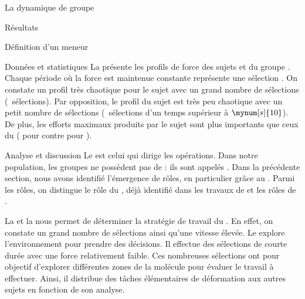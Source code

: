 \documentclass[myfrancais,ngerman,english,french]{mythesis}
\begin{document}
\begin{mychapter}{La dynamique de groupe}
\begin{mysection}{Résultats}
\begin{mysubsection}{Définition d'un meneur}
\begin{mysubsubsection}{Données et statistiques}
					La  présente les profils de force  des sujets  et  du groupe .
					Chaque période où la force est maintenue constante représente une sélection .
					On constate un profil très chaotique pour le sujet  avec un grand nombre de sélections (~sélections).
					Par opposition, le profil du sujet  est très peu chaotique avec un petit nombre de sélections (~sélections d'un temps supérieur à $\mynum[s]{10}$).
					De plus, les efforts maximaux produits par le sujet  sont plus importants que ceux du  ( pour  contre  pour ).
				\end{mysubsubsection}
				\begin{mysubsubsection}{Analyse et discussion}
					Le  est celui qui dirige les opérations.
					Dans notre population, les groupes ne possèdent \myapriori pas de  : ils sont appelés \og {} \fg {}.
					Dans la précédente section, nous avons identifié l'émergence de rôles, en particulier grâce au \mybrainstorming.
					Parmi les rôles, on distingue le rôle du , déjà identifié dans les travaux de  et les rôles de .

					La  et la  nous permet de déterminer la stratégie de travail du .
					En effet, on constate un grand nombre de sélections ainsi qu'une vitesse élevée.
					Le  explore l'environnement pour prendre des décisions.
					Il effectue des sélections de courte durée avec une force relativement faible.
					Ces nombreuses sélections ont pour objectif d'explorer différentes zones de la molécule pour évaluer le travail à effectuer.
					Ainsi, il distribue des tâches élémentaires de déformation aux autres sujets en fonction de son analyse.


\end{mysubsubsection}
\end{mysubsection}
\end{mysection}
\end{mychapter}
\end{document}
